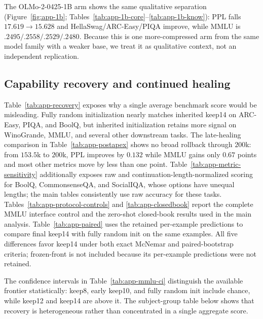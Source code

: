 The OLMo-2-0425-1B arm shows the same qualitative separation
(Figure~\ref{fig:app-1b}; Tables~\ref{tab:app-1b-core}--\ref{tab:app-1b-know}):
PPL falls $17.619\to15.628$ and HellaSwag/ARC-Easy/PIQA improve, while MMLU is
$.2495/.2558/.2529/.2480$. Because this is one more-compressed arm from the same
model family with a weaker base, we treat it as qualitative context, not an
independent replication.



\subsection{Capability recovery and continued healing}
\label{app:recovery}








Table~\ref{tab:app-recovery} exposes why a single average benchmark score would
be misleading. Fully random initialization nearly matches inherited keep14 on
ARC-Easy, PIQA, and BoolQ, but inherited initialization retains more signal on
WinoGrande, MMLU, and several other downstream tasks. The late-healing
comparison in Table~\ref{tab:app-postapex} shows no broad rollback through
$200$k: from $153.5$k to $200$k, PPL improves by $0.132$ while MMLU gains only
$0.67$ points and most other metrics move by less than one point.
Table~\ref{tab:app-metric-sensitivity} additionally exposes raw and
continuation-length-normalized scoring for BoolQ, CommonsenseQA, and SocialIQA,
whose options have unequal lengths; the main tables consistently use raw
accuracy for these tasks. Tables~\ref{tab:app-protocol-controls} and
\ref{tab:app-closedbook} report the complete MMLU interface control and the
zero-shot closed-book results used in the main analysis. Table~\ref{tab:app-paired} uses the retained
per-example predictions to compare final keep14 with fully random init on the
same examples. All five differences favor keep14 under both exact McNemar and
paired-bootstrap criteria; frozen-front is not included because its per-example
predictions were not retained.

The confidence intervals in Table~\ref{tab:app-mmlu-ci} distinguish the
available frontier statistically: keep8, early keep10, and fully random init
include chance, while keep12 and keep14 are above it. The subject-group table below shows that recovery is heterogeneous rather than
concentrated in a single aggregate score.

